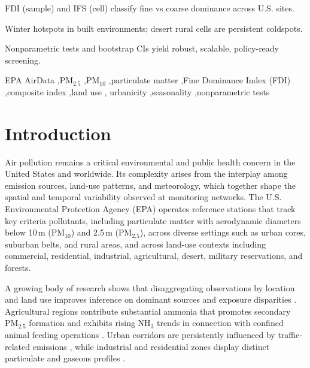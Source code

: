\documentclass[a4paper,fleqn]{cas-sc}
\begin{document}

\begin{highlights}
\item FDI (sample) and IFS (cell) classify fine vs coarse dominance across U.S. sites.
\item Winter hotspots in built environments; desert rural cells are persistent coldspots.
\item Nonparametric tests and bootstrap CIs yield robust, scalable, policy-ready screening.
\end{highlights}

\begin{keywords}
EPA AirData \sep PM$_{2.5}$ \sep PM$_{10}$ \sep particulate matter \sep Fine Dominance Index (FDI) \sep composite index \sep land use \sep 
urbanicity \sep seasonality \sep nonparametric tests
\end{keywords}


\maketitle
\section{Introduction}
Air pollution remains a critical environmental and public health concern in the United States and worldwide. Its complexity arises from the interplay among emission sources, land-use patterns, and meteorology, which together shape the spatial and temporal variability observed at monitoring networks. The U.S. Environmental Protection Agency (EPA) operates reference stations that track key criteria pollutants, including particulate matter with aerodynamic diameters below 10\,\textmu m (PM$_{10}$) and 2.5\,\textmu m (PM$_{2.5}$), across diverse settings such as urban cores, suburban belts, and rural areas, and across land-use contexts including commercial, residential, industrial, agricultural, desert, military reservations, and forests.

A growing body of research shows that disaggregating observations by location and land use improves inference on dominant sources and exposure disparities \citep{Kilpatrick2024, Hart2009, Sooktawee2020}. Agricultural regions contribute substantial ammonia that promotes secondary PM$_{2.5}$ formation and exhibits rising NH$_3$ trends in connection with confined animal feeding operations \citep{Burns2023, Ogwu2024}. Urban corridors are persistently influenced by traffic-related emissions \citep{Alvarado-Molina2023, Nasr2025}, while industrial and residential zones display distinct particulate and gaseous profiles \citep{Bikis2023, Roy2023}.
\end{document}
